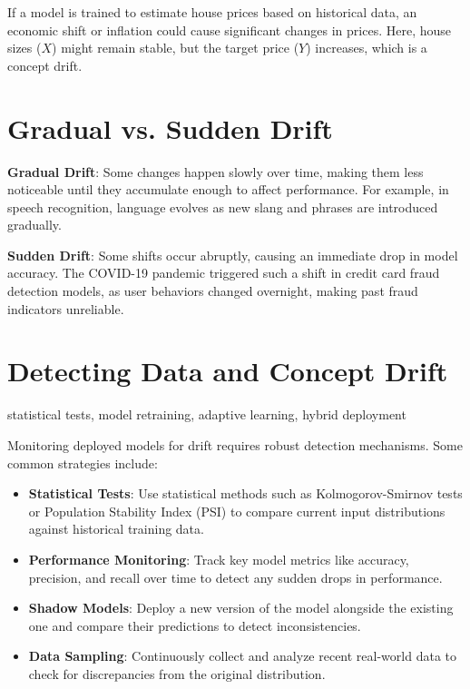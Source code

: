 \documentclass[12pt,openany]{book}
\begin{document}
\begin{examplebox}
     If a model is trained to estimate house prices based on historical data, an economic shift or inflation could cause significant changes in prices. Here, house sizes (\(X\)) might remain stable, but the target price (\(Y\)) increases, which is a concept drift.
\end{examplebox}



\section{Gradual vs. Sudden Drift}

\textbf{Gradual Drift}: Some changes happen slowly over time, making them less noticeable until they accumulate enough to affect performance. For example, in speech recognition, language evolves as new slang and phrases are introduced gradually. \newline

\textbf{Sudden Drift}: Some shifts occur abruptly, causing an immediate drop in model accuracy. The COVID-19 pandemic triggered such a shift in credit card fraud detection models, as user behaviors changed overnight, making past fraud indicators unreliable.



\section{Detecting Data and Concept Drift}

\begin{keywordsbox}
statistical tests, model retraining, adaptive learning, hybrid deployment
\end{keywordsbox}

Monitoring deployed models for drift requires robust detection mechanisms. Some common strategies include:

\begin{itemize}
    \item \textbf{Statistical Tests}: Use statistical methods such as Kolmogorov-Smirnov tests or Population Stability Index (PSI) to compare current input distributions against historical training data.
    \item \textbf{Performance Monitoring}: Track key model metrics like accuracy, precision, and recall over time to detect any sudden drops in performance.
    \item \textbf{Shadow Models}: Deploy a new version of the model alongside the existing one and compare their predictions to detect inconsistencies.
    \item \textbf{Data Sampling}: Continuously collect and analyze recent real-world data to check for discrepancies from the original distribution.
\end{itemize}
\end{document}
